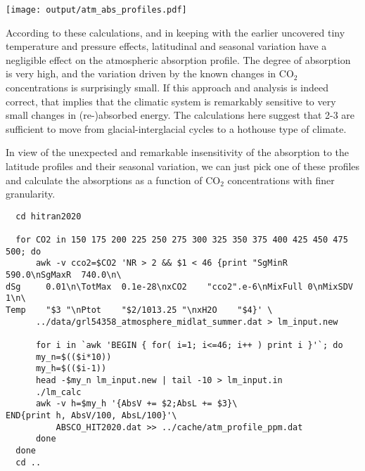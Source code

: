 \documentclass[10pt,a4paper,titlepage]{article}
\begin{document}
\texttt{[image: output/atm\_abs\_profiles.pdf]}

According to these calculations, and in keeping with the earlier
uncovered tiny temperature and pressure effects, latitudinal and
seasonal variation have a negligible effect on the atmospheric
absorption profile. The degree of absorption is very high, and the
variation driven by the known changes in CO$_{\text{2}}$ concentrations is
surprisingly small. If this approach and analysis is indeed correct,
that implies that the climatic system is remarkably sensitive to very
small changes in (re-)absorbed energy. The calculations here suggest
that 2-\unit{3}{\watt\per\metre\squared} are sufficient to move from
glacial-interglacial cycles to a hothouse type of climate.

In view of the unexpected and remarkable insensitivity of the
absorption to the latitude profiles and their seasonal variation, we
can just pick one of these profiles and calculate the absorptions as a
function of CO$_{\text{2}}$ concentrations with finer granularity.

\begin{lstlisting}
  cd hitran2020

  for CO2 in 150 175 200 225 250 275 300 325 350 375 400 425 450 475 500; do
      awk -v cco2=$CO2 'NR > 2 && $1 < 46 {print "SgMinR  590.0\nSgMaxR  740.0\n\
dSg     0.01\n\TotMax  0.1e-28\nxCO2    "cco2".e-6\nMixFull 0\nMixSDV  1\n\
Temp    "$3 "\nPtot    "$2/1013.25 "\nxH2O    "$4}' \
	  ../data/grl54358_atmosphere_midlat_summer.dat > lm_input.new

      for i in `awk 'BEGIN { for( i=1; i<=46; i++ ) print i }'`; do
	  my_n=$(($i*10))
	  my_h=$(($i-1))
	  head -$my_n lm_input.new | tail -10 > lm_input.in
	  ./lm_calc
	  awk -v h=$my_h '{AbsV += $2;AbsL += $3}\
END{print h, AbsV/100, AbsL/100}'\
	      ABSCO_HIT2020.dat >> ../cache/atm_profile_ppm.dat 
      done
  done
  cd ..
\end{lstlisting}
\end{document}
